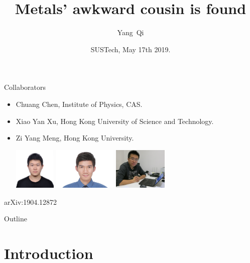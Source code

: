 \documentclass[xcolor=table, 10pt, aspectratio=43]{beamer}
\title[EQMC] %
{Metals' awkward cousin is found}
\author[Y Qi] %
{Yang~Qi}
\institute[Fudan] %
{
Department of Physics, Fudan University.
}
\date{SUSTech, May 17th 2019.}
\begin{document}
\begin{frame}
  \titlepage
\end{frame}

\begin{frame}{Collaborators}
\begin{itemize}
\item Chuang Chen, Institute of Physics, CAS.
\item Xiao Yan Xu, Hong Kong University of Science and Technology.
\item Zi Yang Meng, Hong Kong University.
\begin{center}
  \includegraphics[height=2cm]{../people/chuangchen}
  \includegraphics[height=2cm]{../people/xiaoyanxu}
  \includegraphics[height=2cm]{../people/ziyangmeng}
\end{center}
\end{itemize}
\begin{center}
  \small arXiv:1904.12872
\end{center}
\end{frame}

\begin{frame}{Outline}
		\tableofcontents
\end{frame}

\section{Introduction}
\end{document}
